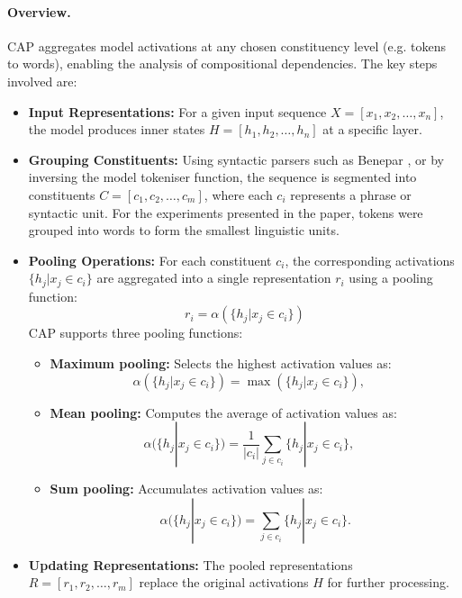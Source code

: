 \paragraph{Overview.} CAP aggregates model activations at any chosen constituency level (e.g. tokens to words), enabling the analysis of compositional dependencies. The key steps involved are:
\begin{itemize}
    \item \textbf{Input Representations:} For a given input sequence \( X = [x_1, x_2, \ldots, x_n] \), the model produces inner states \( H = [h_1, h_2, \ldots, h_n] \) at a specific layer.  

    \item \textbf{Grouping Constituents:} Using syntactic parsers such as Benepar \cite{kitaev-etal-2019-multilingual, kitaev-klein-2018-constituency}, or by inversing the model tokeniser function, the sequence is segmented into constituents \( C = [c_1, c_2, \ldots, c_m] \), where each \( c_i \) represents a phrase or syntactic unit. For the experiments presented in the paper, tokens were grouped into words to form the smallest linguistic units.  

    \item \textbf{Pooling Operations:} For each constituent \( c_i \), the corresponding activations \( \{h_j | x_j \in c_i\} \) are aggregated into a single representation \( r_i \) using a pooling function:
    \[
    r_i = \alpha(\{h_j | x_j \in c_i\}) 
    \]
    CAP supports three pooling functions:
    \begin{itemize}
        \item \textbf{Maximum pooling:} Selects the highest activation values as: \[ \alpha(\{h_j | x_j \in c_i\}) = \max(\{h_j | x_j \in c_i\}), \quad\]
        \item \textbf{Mean pooling:} Computes the average of activation values as: \[\alpha(\{h_j | x_j \in c_i\}) = \frac{1}{|c_i|} \sum_{j \in c_i} \{h_j | x_j \in c_i\}, \quad\]
        \item \textbf{Sum pooling:} Accumulates activation values as: \[\alpha(\{h_j | x_j \in c_i\}) = \sum_{j \in c_i} \{h_j | x_j \in c_i\}.\]
    \end{itemize}

    \item \textbf{Updating Representations:} The pooled representations \( R = [r_1, r_2, \ldots, r_m] \) replace the original activations \( H \) for further processing.  
\end{itemize}

